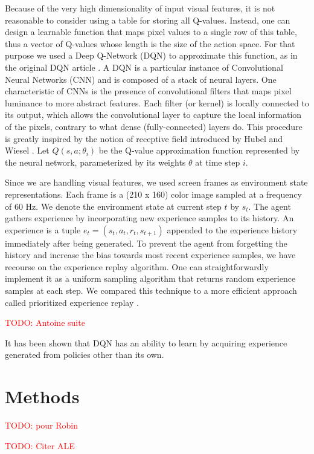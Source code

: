 \documentclass[letterpaper]{article}
\newcommand\todo[1]{\textcolor{red}{TODO: #1}}
\begin{document}
Because of the very high dimensionality of input visual features, it is not reasonable to consider using a table for storing all Q-values.
Instead, one can design a learnable function that maps pixel values to a single row of this table, thus a vector of Q-values whose length is the size
of the action space. For that purpose we used a Deep Q-Network (DQN) to approximate this function, as in the original DQN article \citep{Mnih2015}.
A DQN is a particular instance of Convolutional Neural Networks (CNN) and is composed of a stack of neural layers. One characteristic of CNNs is the
presence of convolutional filters that maps pixel luminance to more abstract features. Each filter (or kernel) is locally connected to its output, which
allows the convolutional layer to capture the local information of the pixels, contrary to what dense (fully-connected) layers do. This procedure is greatly
inspired by the notion of receptive field introduced by Hubel and Wiesel \citep{Hubel1962}.
Let $Q(s, a; \theta_i)$ be the Q-value approximation function represented by the neural network, parameterized by its weights $\theta$ at time step $i$.

Since we are handling visual features, we used screen frames as environment state representations. Each frame is a (210 x 160) color image sampled at
a frequency of 60 Hz. We denote the environment state at current step $t$ by $s_t$. The agent gathers experience by incorporating new experience samples
to its history. An experience is a tuple $e_t = (s_t, a_t, r_t, s_{t+1})$ appended to the experience history immediately after being generated.
To prevent the agent from forgetting the history and increase the bias towards most recent experience samples, we have recourse on the experience
replay algorithm. One can straightforwardly implement it as a uniform sampling algorithm that returns random experience samples at each step.
We compared this technique to a more efficient approach called prioritized experience replay \citep{DBLP:journals/corr/SchaulQAS15}.

  \todo{Antoine suite}

It has been shown that DQN has an ability to learn by acquiring experience generated from policies other than its own.

\section{Methods}

  \todo{pour Robin}

  \todo{Citer ALE} \citep{bellemare13arcade}
\end{document}
